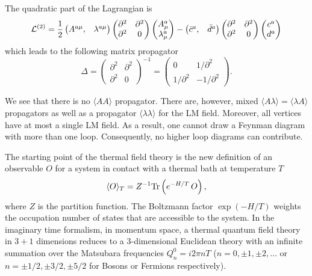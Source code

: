 \documentclass[longbibliography,groupedaddress,showpacs,showkeys,amssymb,eqsecnum,aps,nofootinbib,superscriptaddress]{revtex4}
\newcommand{\be}{\begin{equation}}
\newcommand{\ee}{\end{equation}}
\begin{document}
The quadratic part of the Lagrangian is 
\be\label{e4}
{\cal L}^{(2)} = \frac 1 2
\begin{pmatrix}
A^{a\mu}, & \lambda^{a\mu}
\end{pmatrix}
\begin{pmatrix}
\partial^2 & \partial^2 \\
\partial^2 & 0 
\end{pmatrix}
\begin{pmatrix}
A^a_\mu \\ \lambda^a_\mu 
\end{pmatrix} -
\begin{pmatrix}
{\bar c}^{a}, & {\bar d}^{a}
\end{pmatrix}
\begin{pmatrix}
\partial^2 & \partial^2 \\
\partial^2 & 0 
\end{pmatrix}
\begin{pmatrix}
{c}^a \\ d^a 
\end{pmatrix}
\ee 
which leads to the following matrix propagator
\be\label{e5}
\Delta =
\begin{pmatrix}
\partial^2 & \partial^2 \\
\partial^2 & 0 
\end{pmatrix}^{-1}
=
\begin{pmatrix}
0 & 1/\partial^2 \\
1/\partial^2 & -1/\partial^2 
\end{pmatrix}.
\ee

We see that there is no $\langle A A\rangle$ 
propagator. 
There are, however,  mixed $\langle A \lambda\rangle = \langle \lambda A\rangle$ 
propagators as well as a propagator  
$\langle \lambda\lambda \rangle$ 
for the LM field. 
Moreover, all vertices have at most a single LM field. 
As a result, one cannot draw a Feynman diagram with more than one
loop.  Consequently,  no higher loop diagrams can contribute. 

The starting point of the thermal field theory is the new definition 
of an observable $O$ for a system in contact with a thermal bath at 
temperature $T$ 
\be\label{e6}
\langle O \rangle_T = Z^{-1} {\rm Tr}\left( e^{-H/T} \, O\right),
\ee
where $Z$ is the partition function\cite{lebellac:book96}. 
The Boltzmann factor  $\exp(-H/T)$
weights the occupation number of states that are accessible to the
system. 
In the imaginary time formalism, in momentum space, 
a thermal quantum
field theory in $3+1$ dimensions reduces to a 
$3$-dimensional Euclidean theory with an 
infinite summation over the Matsubara frequencies 
$Q^0_n = i 2\pi n T$ ($n=0,\pm 1, \pm 2,\dots$ or $n=\pm 1/2, \pm 3/2,
\pm 5/2$ for Bosons or Fermions respectively).
\end{document}
